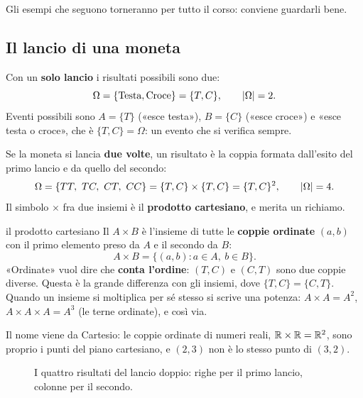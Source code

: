 Gli esempi che seguono torneranno per tutto il corso: conviene guardarli bene.

\subsection{Il lancio di una moneta}

Con un \textbf{solo lancio} i risultati possibili sono due:
\[ \Omega = \{\text{Testa}, \text{Croce}\} = \{T, C\}, \qquad \left\lvert \Omega \right\rvert = 2 . \]
Eventi possibili sono $A = \{T\}$ («esce testa»), $B = \{C\}$ («esce croce») e «esce testa o croce», che è
$\{T, C\} = \Omega$: un evento che si verifica sempre.

Se la moneta si lancia \textbf{due volte}, un risultato è la coppia formata dall'esito del primo lancio e da quello del
secondo:
\[ \Omega = \{TT,\ TC,\ CT,\ CC\} = \{T, C\} \times \{T, C\} = \{T, C\}^2, \qquad \left\lvert \Omega \right\rvert = 4 . \]
Il simbolo $\times$ fra due insiemi è il \textbf{prodotto cartesiano}, e merita un richiamo.

\begin{richiamo}{il prodotto cartesiano}
Il  $A \times B$ è l'insieme di tutte le \textbf{coppie ordinate} $(a, b)$ con il primo
elemento preso da $A$ e il secondo da $B$:
\[ A \times B = \{(a, b) : a \in A,\ b \in B\} . \]
«Ordinate» vuol dire che \textbf{conta l'ordine}: $(T, C)$ e $(C, T)$ sono due coppie diverse. Questa è la grande
differenza con gli insiemi, dove $\{T, C\} = \{C, T\}$. Quando un insieme si moltiplica per sé stesso si scrive una
potenza: $A \times A = A^2$, $A \times A \times A = A^3$ (le terne ordinate), e così via.

Il nome viene da Cartesio: le coppie ordinate di numeri reali, $\mathbb{R} \times \mathbb{R} = \mathbb{R}^2$, sono proprio i punti del piano
cartesiano, e $(2, 3)$ non è lo stesso punto di $(3, 2)$.
\end{richiamo}

\begin{figure}[H]
\centering
{}
\caption{I quattro risultati del lancio doppio: righe per il primo lancio, colonne per il secondo.}
\end{figure}

